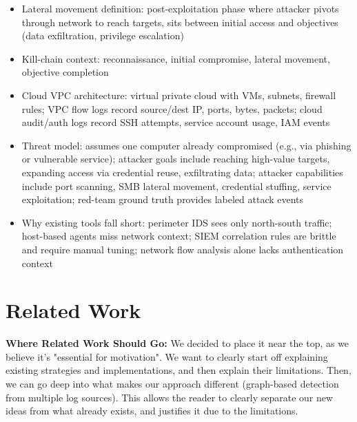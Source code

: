 \documentclass[letterpaper,twocolumn,10pt]{article}
\begin{document}
\begin{itemize}
\item Lateral movement definition: post-exploitation phase where attacker pivots through network to reach targets, sits between initial access and objectives (data exfiltration, privilege escalation)
\item Kill-chain context: reconnaissance, initial compromise, lateral movement, objective completion
\item Cloud VPC architecture: virtual private cloud with VMs, subnets, firewall rules; VPC flow logs record source/dest IP, ports, bytes, packets; cloud audit/auth logs record SSH attempts, service account usage, IAM events
\item Threat model: assumes one computer already compromised (e.g., via phishing or vulnerable service); attacker goals include reaching high-value targets, expanding access via credential reuse, exfiltrating data; attacker capabilities include port scanning, SMB lateral movement, credential stuffing, service exploitation; red-team ground truth provides labeled attack events
\item Why existing tools fall short: perimeter IDS sees only north-south traffic; host-based agents miss network context; SIEM correlation rules are brittle and require manual tuning; network flow analysis alone lacks authentication context
\end{itemize}

\section{Related Work}


\textbf{Where Related Work Should Go:} We decided to place it near the top, as we believe it's "essential for motivation". We want to clearly start off explaining existing strategies and implementations, and then explain their limitations. Then, we can go deep into what makes our approach different (graph-based detection from multiple log sources). This allows the reader to clearly separate our new ideas from what already exists, and justifies it due to the limitations.
\newline
\end{document}

